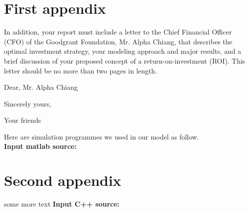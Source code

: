 \documentclass{mcmthesis}
\begin{document}
\begin{appendices}

\section{First appendix}

In addition, your report must include a letter to the Chief Financial Officer (CFO) of the Goodgrant Foundation, Mr. Alpha Chiang, that describes the optimal investment strategy, your modeling approach and major results, and a brief discussion of your proposed concept of a return-on-investment (ROI). This letter should be no more than two pages in length.


\begin{letter}{Dear, Mr. Alpha Chiang}

\lipsum[1-2]


\vspace{\parskip}

Sincerely yours,

Your friends

\end{letter}
Here are simulation programmes we used in our model as follow.\\

\textbf{\textcolor[rgb]{0.98,0.00,0.00}{Input matlab source:}}


\section{Second appendix}

some more text \textcolor[rgb]{0.98,0.00,0.00}{\textbf{Input C++ source:}}


\end{appendices}

\label{LastPage} %

\AImatter
\end{document}
